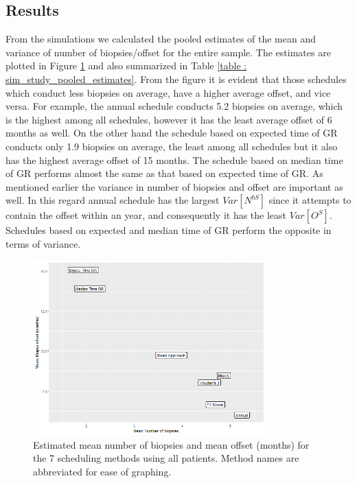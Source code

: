 \subsection{Results}
From the simulations we calculated the pooled estimates of the mean and variance of number of biopsies/offset for the entire sample. The estimates are plotted in Figure \ref{fig : meanNbVsOffset} and also summarized in Table \ref{table : sim_study_pooled_estimates}. From the figure it is evident that those schedules which conduct less biopsies on average, have a higher average offset, and vice versa. For example, the annual schedule conducts 5.2 biopsies on average, which is the highest among all schedules, however it has the least average offset of 6 months as well. On the other hand the schedule based on expected time of GR conducts only 1.9 biopsies on average, the least among all schedules but it also has the highest average offset of 15 months. The schedule based on median time of GR performs almost the same as that based on expected time of GR. As mentioned earlier the variance in number of biopsies and offset are important as well. In this regard annual schedule has the largest $Var[N^{bS}]$ since it attempts to contain the offset within an year, and consequently it has the least $Var[O^S]$. Schedules based on expected and median time of GR perform the opposite in terms of variance.

\begin{figure}[!htb]
	\centering
    \captionsetup{justification=centering}
	\includegraphics[width=0.8\textwidth]{images/sim_study/meanNbVsOffset_all.png}
	\caption{Estimated mean number of biopsies and mean offset (months) for the 7 scheduling methods using all patients. Method names are abbreviated for ease of graphing.}
	\label{fig : meanNbVsOffset}
\end{figure}

